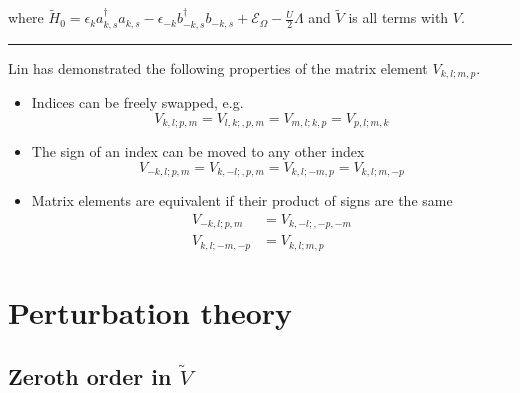 \documentclass[
  letterpaper,
  DIV=11,
  numbers=noendperiod]{scrartcl}
\begin{document}
where
\(\tilde H_0=\epsilon_{k}a^{\dagger}_{k,s}a^{}_{k,s}-\epsilon_{-k}b^{\dagger}_{-k,s}b^{}_{-k,s}+\mathcal{E}_{\Omega}-\frac{U}{2}\Lambda\)
and \(\tilde V\) is all terms with \(V\).

\begin{center}\rule{0.5\linewidth}{0.5pt}\end{center}

\begin{tcolorbox}[enhanced jigsaw, arc=.35mm, bottomrule=.15mm, bottomtitle=1mm, breakable, colback=white, colbacktitle=quarto-callout-note-color!10!white, colframe=quarto-callout-note-color-frame, coltitle=black, left=2mm, leftrule=.75mm, opacityback=0, opacitybacktitle=0.6, rightrule=.15mm, title=\textcolor{quarto-callout-note-color}{\faInfo}\hspace{0.5em}{Symmetries of the matrix element \(V_{k,l;m,p}\)}, titlerule=0mm, toprule=.15mm, toptitle=1mm]

Lin has demonstrated the following properties of the matrix element
\(V_{k,l;m,p}\).

\begin{itemize}
\item
  Indices can be freely swapped, e.g. \begin{equation}
  V_{k,l;p,m}=V_{l,k;,p,m}=V_{m,l;k,p}=V_{p,l;m,k}
  \end{equation}
\item
  The sign of an index can be moved to any other index \begin{equation}
  V_{-k,l;p,m}=V_{k,-l;,p,m}=V_{k,l;-m,p}=V_{k,l;m,-p}
  \end{equation}
\item
  Matrix elements are equivalent if their product of signs are the same
  \begin{align}
  V_{-k,l;p,m}&=V_{k,-l;,-p,-m}\\
  V_{k,l;-m,-p}&=V_{k,l;m,p}
  \end{align}
\end{itemize}

\end{tcolorbox}

\section{Perturbation theory}\label{perturbation-theory}

\subsection{\texorpdfstring{Zeroth order in
\(\tilde V\)}{Zeroth order in \textbackslash tilde V}}\label{zeroth-order-in-tilde-v}
\end{document}
